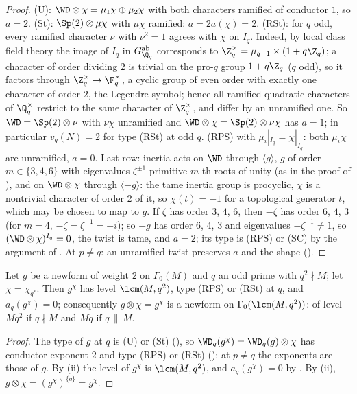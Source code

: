 \begin{proof}
(U): $\WD\otimes\chi=\mu_1\chi\oplus\mu_2\chi$ with both characters ramified of conductor $1$, so $a=2$. (St): $\Sp(2)\otimes\mu\chi$ with $\mu\chi$ ramified: $a=2a(\chi)=2$. (RSt): for
$q$ odd, every ramified character $\nu$ with $\nu^2=1$ agrees with $\chi$ on $I_q$. Indeed, by local class field theory the image of $I_q$ in $G_{\Q_q}^{\mathrm{ab}}$ corresponds to $\Z_q^\times=\mu_{q-1}\times(1+q\Z_q)$;
a character of order dividing $2$ is trivial on the pro-$q$ group $1+q\Z_q$ ($q$ odd), so it factors through $\Z_q^\times\to\F_q^\times$, a cyclic group of even order with exactly one
character of order $2$, the Legendre symbol; hence all ramified quadratic characters of $\Q_q^\times$ restrict to the same character of $\Z_q^\times$, and differ by an unramified one. So
$\WD=\Sp(2)\otimes\nu$ with $\nu\chi$ unramified and $\WD\otimes\chi=\Sp(2)\otimes\nu\chi$ has $a=1$; in particular $v_q(N)=2$ for type (RSt) at odd $q$. (RPS) with
$\mu_i|_{I_q}=\chi|_{I_q}$: both $\mu_i\chi$ are unramified, $a=0$. Last row: inertia acts on $\WD$ through $\langle g\rangle$, $g$ of order $m\in\{3,4,6\}$ with eigenvalues $\zeta^{\pm1}$
primitive $m$-th roots of unity (as in the proof of ), and on $\WD\otimes\chi$ through $\langle-g\rangle$: the tame inertia group is
procyclic, $\chi$ is a nontrivial character of order $2$ of it, so $\chi(t)=-1$ for a topological generator $t$, which may be chosen to map to $g$. If $\zeta$ has order $3$, $4$, $6$, then
$-\zeta$ has order $6$, $4$, $3$ (for $m=4$, $-\zeta=\zeta^{-1}=\pm i$); so $-g$ has order $6$, $4$, $3$ and eigenvalues $-\zeta^{\pm1}\ne1$, so $(\WD\otimes\chi)^{I_q}=0$, the twist is tame, and $a=2$; its type is (RPS) or (SC) by the argument of
. At $p\ne q$: an unramified twist preserves $a$ and the shape ().
\end{proof}

\begin{corollary}\label{cor:modgalrep:atkin-li}
Let $g$ be a newform of weight $2$ on $\Gamma_0(M)$ and $q$ an odd prime with $q^2\nmid M$; let $\chi=\chi_{q^*}$. Then $g^\chi$ has level $\lcm(M,q^2)$, type (RPS) or
(RSt) at $q$, and $a_q(g^\chi)=0$; consequently $g\otimes\chi=g^\chi$ is a newform on $\Gamma_0(\lcm(M,q^2))$: of level $Mq^2$ if $q\nmid M$ and $Mq$ if $q\,\|\,M$.
\end{corollary}

\begin{proof}
The type of $g$ at $q$ is (U) or (St) (), so $\WD_q(g^\chi)=\WD_q(g)\otimes\chi$ has conductor exponent $2$ and type (RPS) or (RSt)
(); at $p\ne q$ the exponents are those of $g$. By (ii) the level of $g^\chi$ is $\lcm(M,q^2)$, and
$a_q(g^\chi)=0$ by . By (ii), $g\otimes\chi=(g^\chi)^{\{q\}}=g^\chi$.
\end{proof}

